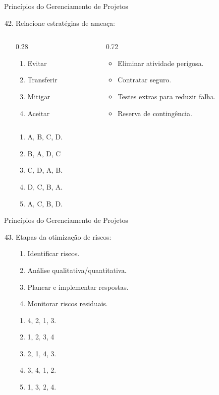 \documentclass{beamer}
\begin{document}
\begin{frame}{Princípios do Gerenciamento de Projetos}
	\begin{enumerate}
		\setcounter{enumi}{41}
		\justifying
		\item Relacione estratégias de ameaça:
		\begin{columns}
			\begin{column}{0.28\textwidth}
				\begin{enumerate}[A]
					\item Evitar
					\item Transferir
					\item Mitigar
					\item Aceitar
				\end{enumerate}
			\end{column}
			\begin{column}{0.72\textwidth}
				\begin{itemize}
					\item Eliminar atividade perigosa.
					\item Contratar seguro.
					\item Testes extras para reduzir falha.
					\item Reserva de contingência.
				\end{itemize}
			\end{column}
		\end{columns}
		\begin{enumerate}[a]
			\item A, B, C, D.
			\item \alert<2>{B, A, D, C}
			\item C, D, A, B.
			\item D, C, B, A.
			\item A, C, B, D.
		\end{enumerate}
	\end{enumerate}
\end{frame}

\begin{frame}{Princípios do Gerenciamento de Projetos}
	\begin{enumerate}
		\setcounter{enumi}{42}
		\justifying
		\item Etapas da otimização de riscos:
		\begin{enumerate}[I]
			\item Identificar riscos.
			\item Análise qualitativa/quantitativa.
			\item Planear e implementar respostas.
			\item Monitorar riscos residuais.
		\end{enumerate}
		\begin{enumerate}[a]
			\item 4, 2, 1, 3.
			\item \alert<2>{1, 2, 3, 4}
			\item 2, 1, 4, 3.
			\item 3, 4, 1, 2.
			\item 1, 3, 2, 4.
		\end{enumerate}
	\end{enumerate}
\end{frame}
\end{document}
